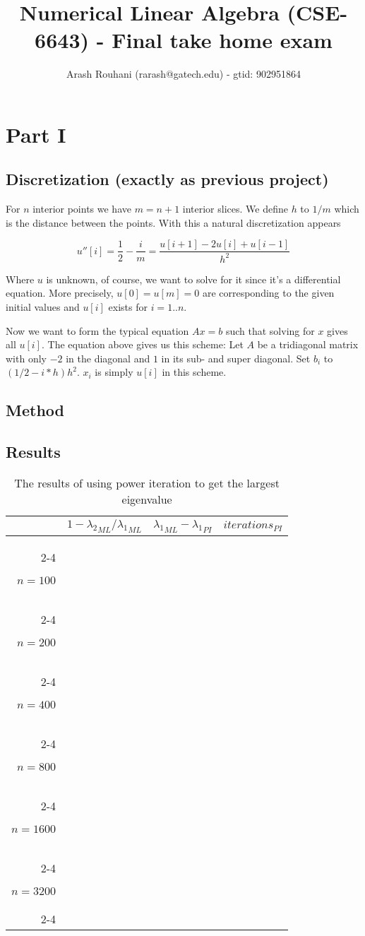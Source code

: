 \documentclass[a4paper,11pt]{article}
\title{Numerical Linear Algebra (CSE-6643) - Final take home exam}
\author{Arash Rouhani (rarash@gatech.edu) - gtid: 902951864}
\begin{document}
\maketitle

\section{Part I}


\subsection{Discretization (exactly as previous project)}

For $n$ interior points we have $m=n+1$ interior slices. We define $h$
to $1/m$ which is the distance between the points. With this a natural
discretization appears

\[
  u''[i] = \frac{1}{2} - \frac{i}{m} = \frac{u[i+1]-2u[i]+u[i-1]}{h^2}
\]

Where $u$ is unknown, of course, we want to solve for it since it's a
differential equation. More precisely, $u[0]=u[m]=0$ are corresponding
to the given initial values and $u[i]$ exists for $i = 1..n$.

Now we want to form the typical equation $Ax=b$ such that solving for
$x$ gives all $u[i]$. The equation above gives us this scheme: Let $A$
be a tridiagonal matrix with only $-2$ in the diagonal and $1$ in its
sub- and super diagonal. Set $b_i$ to $(1/2-i*h)h^2$. $x_i$ is simply
$u[i]$ in this scheme.

\subsection{Method}

\subsection{Results}

\newcommand{\foralln}[1] {
  #1{100}
  #1{200}
  #1{400}
  #1{800}
  #1{1600}
  #1{3200}
}

\newcommand{\pimacro}[1] {
  \ensuremath{n=#1} & 
                    & 
                    & 
                    \\ \cline{2-4}
}
\begin{table}[h]
  \begin{tabular}{r|c|c|c|}
    \multicolumn{1}{r}{}
     & \multicolumn{1}{c}{$1-{\lambda_2}_{ML}/{\lambda_1}_{ML}$}
     & \multicolumn{1}{c}{${\lambda_1}_{ML}-{\lambda_1}_{PI}$}
     & \multicolumn{1}{c}{$iterations_{PI}$}\\
    \cline{2-4}
    \foralln{\pimacro}
  \end{tabular}
  \caption{The results of using power iteration to get the largest eigenvalue}
  \label{tab:powerit}
\end{table}
\end{document}
